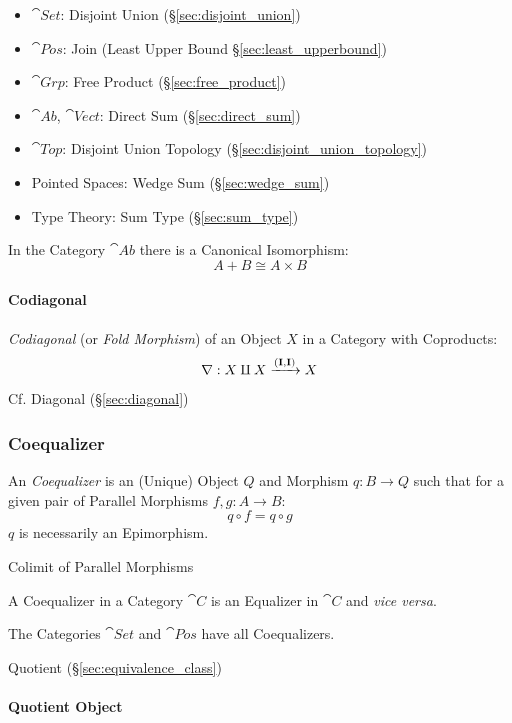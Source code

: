 \begin{itemize}
\item $\cat{Set}$: Disjoint Union (\S\ref{sec:disjoint_union})
\item $\cat{Pos}$: Join (Least Upper Bound
  \S\ref{sec:least_upperbound})
\item $\cat{Grp}$: Free Product (\S\ref{sec:free_product})
\item $\cat{Ab}$, $\cat{Vect}$: Direct Sum (\S\ref{sec:direct_sum})
\item $\cat{Top}$: Disjoint Union Topology
  (\S\ref{sec:disjoint_union_topology})
\item Pointed Spaces: Wedge Sum (\S\ref{sec:wedge_sum})
\item Type Theory: Sum Type (\S\ref{sec:sum_type})
\end{itemize}

In the Category $\cat{Ab}$ there is a Canonical
Isomorphism:\cite{awodey06}
\[
  A + B \cong A \times B
\]



\paragraph{Codiagonal}\label{sec:codiagonal}\hfill

\emph{Codiagonal} (or \emph{Fold Morphism}) of an Object $X$ in a
Category with Coproducts:
\[
  \nabla : X \amalg X \xrightarrow{(\mathbf{I},\mathbf{I})} X
\]

\fist Cf. Diagonal (\S\ref{sec:diagonal})



\subsubsection{Coequalizer}\label{sec:coequalizer}

An \emph{Coequalizer} is an (Unique) Object $Q$ and Morphism $q: B
\rightarrow Q$ such that for a given pair of Parallel Morphisms $f,g :
A \rightarrow B$:
\[
  q \circ f = q \circ g
\]
$q$ is necessarily an Epimorphism.

Colimit of Parallel Morphisms

A Coequalizer in a Category $\cat{C}$ is an Equalizer in
$\cat{C}$ and \emph{vice versa}.

The Categories $\cat{Set}$ and $\cat{Pos}$ have all
Coequalizers.

Quotient (\S\ref{sec:equivalence_class})



\paragraph{Quotient Object}\label{sec:quotient_object}\hfill

